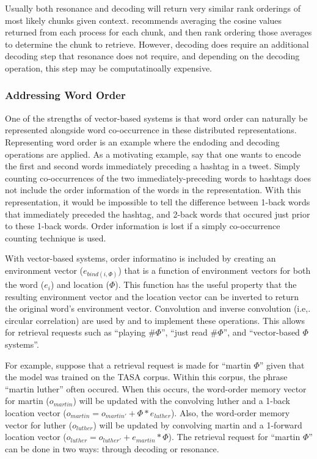 \documentclass[man,floatsintext]{apa6}
\begin{document}
Usually both resonance and decoding will return very similar rank orderings of most likely chunks given context.
\textcite{Jones2007} recommends averaging the cosine values returned from each process for each chunk, and then rank ordering those averages to determine the chunk to retrieve.
However, decoding does require an additional decoding step that resonance does not require, and depending on the decoding operation, this step may be computatinoally expensive.

\subsubsection{Addressing Word Order}

One of the strengths of vector-based systems is that word order can naturally be represented alongside word co-occurrence in these distributed representations.
Representing word order is an example where the endoding and decoding operations are applied.
As a motivating example, say that one wants to encode the first and second words immediately preceding a hashtag in a tweet.
Simply counting co-occurrences of the two immediately-preceding words to hashtags does not include the order information of the words in the representation.
With this representation, it would be impossible to tell the difference between 1-back words that immediately preceded the hashtag, and 2-back words that occured just prior to these 1-back words.
Order information is lost if a simply co-occurrence counting technique is used.

With vector-based systems, order informatino is included by creating an environment vector ($e_{bind(i,\Phi)}$) that is a function of environment vectors for both the word ($e_{i}$) and location ($\Phi$).
This function has the useful property that the resulting environment vector and the location vector can be inverted to return the original word's environment vector.
Convolution and inverse convolution (i.e,. circular correlation) are used by \textcite{Plate1995} and \textcite{Jones2007} to implement these operations.
This allows for retrieval requests such as ``playing \#$\Phi$'', ``just read \#$\Phi$'', and ``vector-based $\Phi$ systems''.

For example, suppose that a retrieval request is made for ``martin $\Phi$'' given that the model was trained on the TASA corpus.
Within this corpus, the phrase ``martin luther'' often occured.
When this occurs, the word-order memory vector for martin ($o_{martin}$) will be updated with the convolving luther and a 1-back location vector ($o_{martin} = o_{martin'} + \Phi * e_{luther}$).
Also, the word-order memory vector for luther ($o_{luther}$) will be updated by convolving martin and a 1-forward location vector ($o_{luther} = o_{luther'} + e_{martin} * \Phi$).
The retrieval request for ``martin $\Phi$'' can be done in two ways: through decoding or resonance.
\end{document}
